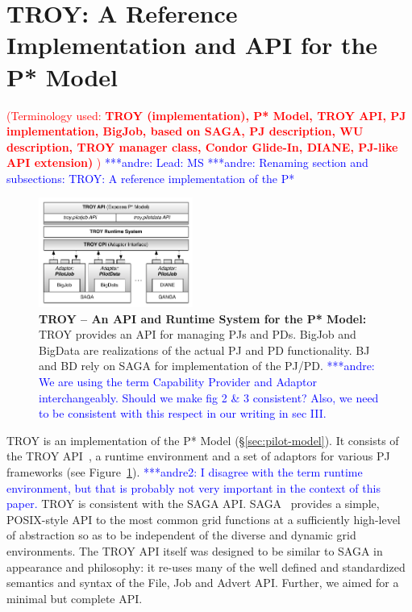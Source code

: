 \documentclass[conference,final]{IEEEtran}
\newcommand{\terminology}[1]{ {\textcolor{red} {(Terminology used: \textbf{#1}) }}}
\newcommand{\jhanote}[1]{ {\textcolor{red} { ***shantenu: #1 }}}
\newcommand{\alnote}[1]{ {\textcolor{blue} { ***andre: #1 }}}
\newcommand{\amnote}[1]{ {\textcolor{blue} { ***andre2: #1 }}}
\newcommand{\msnote}[1]{ {\textcolor{cyan} { ***mark: #1 }}}
\newcommand{\terminology}[1]{}
\newcommand{\alnote}[1]{}
\newcommand{\amnote}[1]{}
\newcommand{\jhanote}[1]{}
\newcommand{\msnote}[1]{}
\newcommand{\upp}{\vspace*{-0.5em}}
\begin{document}
\section{TROY: A Reference Implementation and API for the P*
  Model\upp\upp}
\terminology{TROY (implementation), P* Model, TROY API, PJ implementation, BigJob, based on SAGA,
PJ description, WU description, TROY manager class, Condor Glide-In, DIANE, PJ-like API extension)
}
\alnote{Lead: MS}
\alnote{Renaming section and subsections: TROY: A reference implementation of the P*}



\begin{figure}[t]
	\centering
		\includegraphics[width=0.45\textwidth]{figures/TROY_arch.pdf}
	\caption{\textbf{TROY -- An API and Runtime System for the P* Model:}  TROY 
	provides an API for managing PJs and PDs. BigJob and BigData are 
	realizations of the actual PJ and PD functionality. BJ and BD
	rely on SAGA for implementation of the PJ/PD.\alnote{We are using the term 
	Capability Provider and Adaptor interchangeably. Should we make fig 2 \& 3 
	consistent? Also, we need to be consistent with this respect in our writing 
	in sec III.}
	}
	\label{fig:figures_pstar_troy}
\end{figure}

TROY is an implementation of the P* Model (\S\ref{sec:pilot-model}). It
consists of the TROY API~\cite{troy}, a runtime environment  and a set of 
adaptors for various PJ frameworks (see 
Figure~\ref{fig:figures_pstar_troy}). \amnote{I disagree with the term
runtime environment, but that is probably not very important in the context of
this paper.} TROY is consistent with the SAGA API. SAGA~\cite{saga_url,saga_gfd90} provides a simple,
POSIX-style API to the most common grid functions at a sufficiently high-level
of abstraction so as to be independent of the diverse and dynamic grid
environments. The TROY API itself was designed to be similar to SAGA in
appearance and philosophy: it re-uses many of the well defined and
standardized semantics and syntax of the File, Job and Advert API. Further, we
aimed for a minimal but complete API.%
\end{document}
